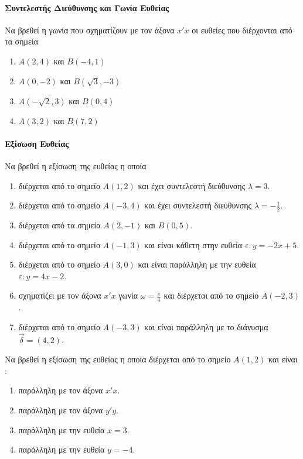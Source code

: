 \documentclass[11pt,a4paper,modern]{FFExercises}
\begin{document}

\paragraph{Συντελεστής Διεύθυνσης και Γωνία Ευθείας}
\askhsh
Να βρεθεί η γωνία που σχηματίζουν με τον άξονα $ x'x $ οι ευθείες που διέρχονται από τα σημεία 

	\begin{enumerate}[label=\alph*.]
	\item $ Α(2,4) $ και $ Β(-4,1) $
	\item $ Α(0,-2) $ και $ Β(\sqrt{3},-3) $
	\item $ Α(-\sqrt{2},3) $ και $ Β(0,4) $
	\item $ Α(3,2) $ και $ Β(7,2) $
	\end{enumerate}


\paragraph{Εξίσωση Ευθείας}
\askhsh
Να βρεθεί η εξίσωση της ευθείας η οποία
\begin{enumerate}[itemsep=0mm,label=\alph*.]
	\item διέρχεται από το σημείο $ Α(1,2) $ και έχει συντελεστή διεύθυνσης $ \lambda=3 $.
	\item διέρχεται από το σημείο $ Α(-3,4) $ και έχει συντελεστή διεύθυνσης $ \lambda=-\frac{1}{2} $.
	\item διέρχεται από τα σημεία $ Α(2,-1) $ και $ Β(0,5) $.
	\item διέρχεται από το σημείο $ Α(-1,3) $ και είναι κάθετη στην ευθεία $ \varepsilon : y=-2x+5 $.
	\item διέρχεται από το σημείο $ Α(3,0) $ και είναι παράλληλη με την ευθεία $ \varepsilon : y=4x-2 $.
	\item σχηματίζει με τον άξονα $ x'x $ γωνία $ \omega=\frac{\pi}{4} $ και διέρχεται από το σημείο $ Α(-2,3) $.
	\item διέρχεται από το σημείο $ Α(-3,3) $ και είναι παράλληλη με το διάνυσμα $ \overrightarrow{\delta}=(4,2) $.
\end{enumerate}

\askhsh
Να βρεθεί η εξίσωση της ευθείας η οποία διέρχεται από το σημείο $ Α(1,2) $ και είναι :
\begin{enumerate}[itemsep=0mm,label=\alph*.]
	\item παράλληλη με τον άξονα $ x'x $.
	\item παράλληλη με τον άξονα $ y'y $.
	\item παράλληλη με την ευθεία $ x=3 $.
	\item παράλληλη με την ευθεία $ y=-4 $.
\end{enumerate}
\end{document}
